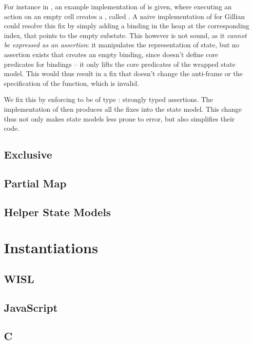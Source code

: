 For instance in \cite{sacha-phd}, an example implementation of \PMap{} is given, where executing an action on an empty cell creates a \Miss{}, called . A naive implementation of \PMap{} for Gillian could resolve this fix by simply adding a binding in the heap at the corresponding index, that points to the empty substate. This however is not sound, as it \emph{cannot be expressed as an assertion}: it manipulates the representation of state, but no assertion exists that creates an empty binding, since \PMap{} doesn't define core predicates for bindings -- it only lifts the core predicates of the wrapped state model. This would thus result in a fix that doesn't change the anti-frame or the specification of the function, which is invalid.

We fix this by enforcing  to be of type : strongly typed assertions. The implementation of  then produces all the fixes into the state model. This change thus not only makes state models less prone to error, but also simplifies their code.

\subsection{Exclusive}

\subsection{Partial Map}

\subsection{Helper State Models}

\section{Instantiations} \label{sec:impl-instantiations}

\subsection{WISL}

\subsection{JavaScript}

\subsection{C}

